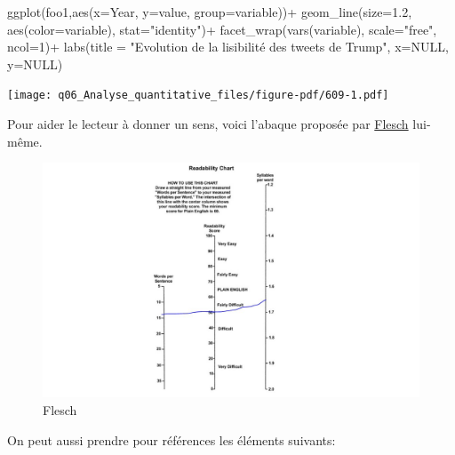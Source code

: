 \documentclass[
  letterpaper,
  DIV=11,
  numbers=noendperiod]{scrreprt}
\newenvironment{Shaded}{\begin{snugshade}}{\end{snugshade}}
\newcommand{\AttributeTok}[1]{\textcolor[rgb]{0.40,0.45,0.13}{#1}}
\newcommand{\ConstantTok}[1]{\textcolor[rgb]{0.56,0.35,0.01}{#1}}
\newcommand{\DecValTok}[1]{\textcolor[rgb]{0.68,0.00,0.00}{#1}}
\newcommand{\FloatTok}[1]{\textcolor[rgb]{0.68,0.00,0.00}{#1}}
\newcommand{\FunctionTok}[1]{\textcolor[rgb]{0.28,0.35,0.67}{#1}}
\newcommand{\NormalTok}[1]{\textcolor[rgb]{0.00,0.23,0.31}{#1}}
\newcommand{\SpecialCharTok}[1]{\textcolor[rgb]{0.37,0.37,0.37}{#1}}
\newcommand{\StringTok}[1]{\textcolor[rgb]{0.13,0.47,0.30}{#1}}
\begin{document}
\begin{Shaded}
\begin{Highlighting}[]
\FunctionTok{ggplot}\NormalTok{(foo1,}\FunctionTok{aes}\NormalTok{(}\AttributeTok{x=}\NormalTok{Year, }\AttributeTok{y=}\NormalTok{value, }\AttributeTok{group=}\NormalTok{variable))}\SpecialCharTok{+}
  \FunctionTok{geom\_line}\NormalTok{(}\AttributeTok{size=}\FloatTok{1.2}\NormalTok{, }\FunctionTok{aes}\NormalTok{(}\AttributeTok{color=}\NormalTok{variable), }\AttributeTok{stat=}\StringTok{"identity"}\NormalTok{)}\SpecialCharTok{+}
  \FunctionTok{facet\_wrap}\NormalTok{(}\FunctionTok{vars}\NormalTok{(variable), }\AttributeTok{scale=}\StringTok{"free"}\NormalTok{, }\AttributeTok{ncol=}\DecValTok{1}\NormalTok{)}\SpecialCharTok{+}
  \FunctionTok{labs}\NormalTok{(}\AttributeTok{title =} \StringTok{"Evolution de la lisibilité des tweets de Trump"}\NormalTok{, }\AttributeTok{x=}\ConstantTok{NULL}\NormalTok{, }\AttributeTok{y=}\ConstantTok{NULL}\NormalTok{)}
\end{Highlighting}
\end{Shaded}

\texttt{[image: q06\_Analyse\_quantitative\_files/figure-pdf/609-1.pdf]}

Pour aider le lecteur à donner un sens, voici l'abaque proposée par
\href{http://www.appstate.edu/~steelekm/classes/psy2664/Flesch.htm}{Flesch}
lui-même.

\begin{figure}[H]

{\centering \includegraphics{./image/ReadabilityFlesch.JPG}

}

\caption{Flesch}

\end{figure}%

On peut aussi prendre pour références les éléments suivants:
\end{document}
